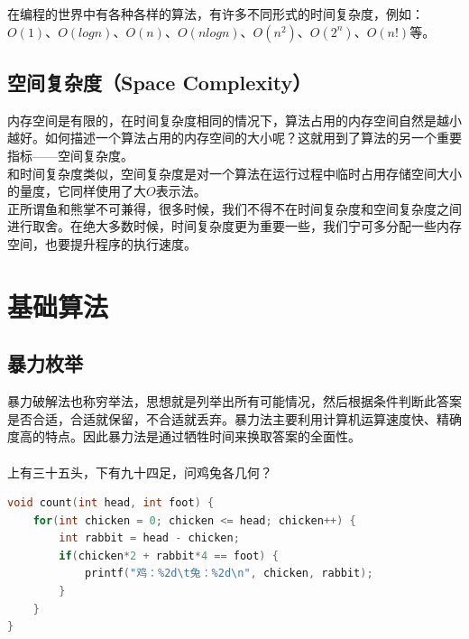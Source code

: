 在编程的世界中有各种各样的算法，有许多不同形式的时间复杂度，例如：$ O(1) $、$ O(logn) $、$ O(n) $、$ O(nlogn) $、$ O(n^2) $、$ O(2^n) $、$ O(n!) $等。

\subsection{空间复杂度（Space Complexity）}

内存空间是有限的，在时间复杂度相同的情况下，算法占用的内存空间自然是越小越好。如何描述一个算法占用的内存空间的大小呢？这就用到了算法的另一个重要指标——空间复杂度。 \\

和时间复杂度类似，空间复杂度是对一个算法在运行过程中临时占用存储空间大小的量度，它同样使用了大$ O $表示法。 \\

正所谓鱼和熊掌不可兼得，很多时候，我们不得不在时间复杂度和空间复杂度之间进行取舍。在绝大多数时候，时间复杂度更为重要一些，我们宁可多分配一些内存空间，也要提升程序的执行速度。

\newpage

\section{基础算法}

\subsection{暴力枚举}

暴力破解法也称穷举法，思想就是列举出所有可能情况，然后根据条件判断此答案是否合适，合适就保留，不合适就丢弃。暴力法主要利用计算机运算速度快、精确度高的特点。因此暴力法是通过牺牲时间来换取答案的全面性。 \\

 \\

上有三十五头，下有九十四足，问鸡兔各几何？

\begin{lstlisting}[language=C]
void count(int head, int foot) {
	for(int chicken = 0; chicken <= head; chicken++) {
		int rabbit = head - chicken;
		if(chicken*2 + rabbit*4 == foot) {
			printf("鸡：%2d\t兔：%2d\n", chicken, rabbit);
		}
	}
}
\end{lstlisting}

\vspace{0.5cm}

 \\

